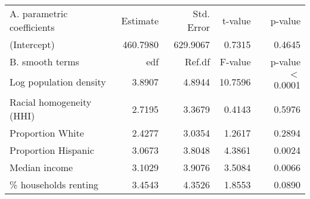 \begin{table}[ht]
\centering
\begin{tabular}{lrrrr}
   \hline
A. parametric coefficients & Estimate & Std. Error & t-value & p-value \\ 
  (Intercept) & 460.7980 & 629.9067 & 0.7315 & 0.4645 \\ 
   \hline
B. smooth terms & edf & Ref.df & F-value & p-value \\ 
  Log population density & 3.8907 & 4.8944 & 10.7596 & $<$ 0.0001 \\ 
  Racial homogeneity (HHI) & 2.7195 & 3.3679 & 0.4143 & 0.5976 \\ 
  Proportion White & 2.4277 & 3.0354 & 1.2617 & 0.2894 \\ 
  Proportion Hispanic & 3.0673 & 3.8048 & 4.3861 & 0.0024 \\ 
  Median income & 3.1029 & 3.9076 & 3.5084 & 0.0066 \\ 
  \% households renting & 3.4543 & 4.3526 & 1.8553 & 0.0890 \\ 
   \hline
\end{tabular}
\caption{ } 
\label{Demographic GAM}
\end{table}
